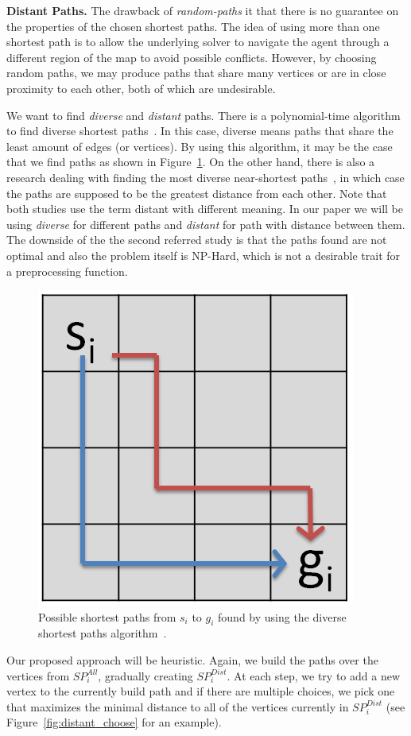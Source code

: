 %
\textbf{Distant Paths.}
The drawback of \emph{random-paths} it that there is no guarantee on the properties of the chosen shortest paths. The idea of using more than one shortest path is to allow the underlying solver to navigate the agent through a different region of the map to avoid possible conflicts. However, by choosing random paths, we may produce paths that share many vertices or are in close proximity to each other, both of which are undesirable.

We want to find \emph{diverse} and \emph{distant} paths. There is a polynomial-time algorithm to find diverse shortest paths~\cite{diverse}. In this case, diverse means paths that share the least amount of edges (or vertices). By using this algorithm, it may be the case that we find paths as shown in Figure~\ref{fig:diverse}. On the other hand, there is also a research dealing with finding the most diverse near-shortest paths~\cite{distant}, in which case the paths are supposed to be the greatest distance from each other. Note that both studies use the term distant with different meaning. In our paper we will be using \emph{diverse} for different paths and \emph{distant} for path with distance between them. The downside of the the second referred study is that the paths found are not optimal and also the problem itself is NP-Hard, which is not a desirable trait for a preprocessing function.

\begin{figure}[hb]
\centering
\includegraphics[width=0.25\columnwidth]{img/diverse.PNG}
\caption{Possible shortest paths from $s_i$ to $g_i$ found by using the diverse shortest paths algorithm~\cite{diverse}.}
\label{fig:diverse}
\end{figure}


Our proposed approach will be heuristic. Again, we build the paths over the vertices from $SP_i^{All}$, gradually creating $SP_i^{Dist}$. At each step, we try to add a new vertex to the currently build path and if there are multiple choices, we pick one that maximizes the minimal distance to all of the vertices currently in $SP_i^{Dist}$ (see Figure~\ref{fig:distant_choose} for an example).

